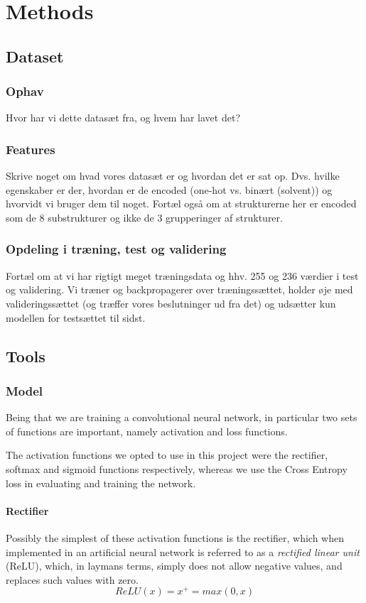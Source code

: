 \section{Methods}

\subsection{Dataset}
\subsubsection{Ophav}
Hvor har vi dette datasæt fra, og hvem har lavet det?

\subsubsection{Features}
Skrive noget om hvad vores datasæt er og hvordan det er sat op. Dvs. hvilke egenskaber er der, hvordan er de encoded (one-hot vs. binært (solvent)) og hvorvidt vi bruger dem til noget. Fortæl også om at strukturerne her er encoded som de 8 substrukturer og ikke de 3 grupperinger af strukturer.

\subsubsection{Opdeling i træning, test og validering}
Fortæl om at vi har rigtigt meget træningsdata og hhv. 255 og 236 værdier i test og validering. Vi træner og backpropagerer over træningssættet, holder øje med valideringssættet (og træffer vores beslutninger ud fra det) og udsætter kun modellen for testsættet til sidst.

\subsection{Tools}
\subsubsection{Model}
Being that we are training a convolutional neural network, in particular two sets of functions are important, namely activation and loss functions.

The activation functions we opted to use in this project were the rectifier, softmax and sigmoid functions respectively, whereas we use the Cross Entropy loss in evaluating and training the network.
\paragraph{Rectifier}
Possibly the simplest of these activation functions is the rectifier, which when implemented in an artificial neural network is referred to as a \textit{rectified linear unit} (ReLU), which, in laymans terms, simply does not allow negative values, and replaces such values with zero.
\[
ReLU(x) = x^+ = max(0,x)
\]

